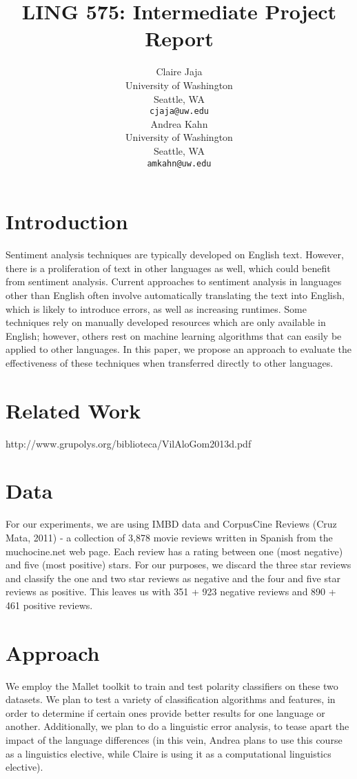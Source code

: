 \documentclass[11pt]{article}
\title{LING 575: Intermediate Project Report}
\author{Claire Jaja \\
  University of Washington \\
  Seattle, WA \\
  {\tt cjaja@uw.edu} \\\And
  Andrea Kahn \\
  University of Washington \\
  Seattle, WA \\
  {\tt amkahn@uw.edu} \\}
\date{}
\begin{document}
\maketitle
\begin{abstract}
\end{abstract}

\section{Introduction}

Sentiment analysis techniques are typically developed on English text.  However, there is a proliferation of text in other languages as well, which could benefit from sentiment analysis.  Current approaches to sentiment analysis in languages other than English often involve automatically translating the text into English, which is likely to introduce errors, as well as increasing runtimes.  Some techniques rely on manually developed resources which are only available in English; however, others rest on machine learning algorithms that can easily be applied to other languages.  In this paper, we propose an approach to evaluate the effectiveness of these techniques when transferred directly to other languages.

\section{Related Work}

http://www.grupolys.org/biblioteca/VilAloGom2013d.pdf

\section{Data}

For our experiments, we are using IMBD data
and CorpusCine Reviews (Cruz Mata, 2011) - a collection of 3,878 movie reviews written in Spanish from the muchocine.net web page.  Each review has a rating between one (most negative) and five (most positive) stars.  For our purposes, we discard the three star reviews and classify the one and two star reviews as negative and the four and five star reviews as positive.  This leaves us with 351 + 923 negative reviews and 890 + 461 positive reviews.

\section{Approach}

We employ the Mallet toolkit to train and test polarity classifiers on these two datasets.  We plan to test a variety of classification algorithms and features, in order to determine if certain ones provide better results for one language or another.  Additionally, we plan to do a linguistic error analysis, to tease apart the impact of the language differences (in this vein, Andrea plans to use this course as a linguistics elective, while Claire is using it as a computational linguistics elective).
\end{document}
